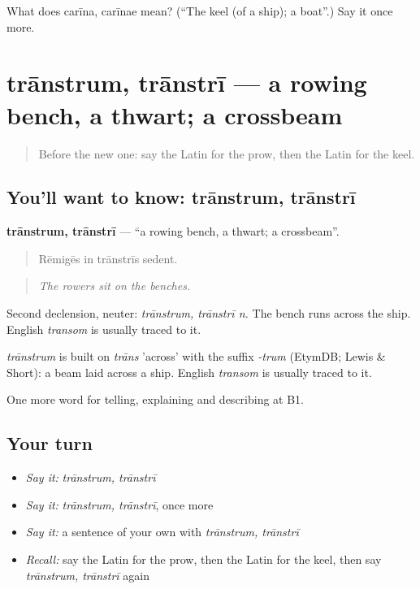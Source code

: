 \begin{tcolorbox}[breakable,colback=teal!4,colframe=teal!35!black,title={Before you move on}]
What does carīna, carīnae mean? (\textquotedblleft{}The keel (of a ship); a boat\textquotedblright{}.) Say it once more.
\end{tcolorbox}
\section[trānstrum, trānstrī]{trānstrum, trānstrī — a rowing bench, a thwart; a crossbeam}

\label{lesson:LA-C436-transtrum}



\begin{quote}
Before the new one: say the Latin for the prow, then the Latin for the keel.
\end{quote}

\subsection*{You'll want to know: trānstrum, trānstrī}
\textbf{trānstrum, trānstrī} — \textquotedblleft{}a rowing bench, a thwart; a crossbeam\textquotedblright{}.

\begin{quote}
Rēmigēs in trānstrīs sedent.
\end{quote}

\begin{quote}
\emph{The rowers sit on the benches.}
\end{quote}

Second declension, neuter: \emph{trānstrum, trānstrī n.} The bench runs across the ship. English \emph{transom} is usually traced to it.

\begin{cousinweb}
\emph{trānstrum} is built on \emph{trāns} 'across' with the suffix \emph{-trum} (EtymDB; Lewis \& Short): a beam laid across a ship. English \emph{transom} is usually traced to it.
\end{cousinweb}

\begin{grammarlens}[title={What you've built}]
One more word for telling, explaining and describing at B1.
\end{grammarlens}

\subsection*{Your turn}
\begin{itemize}
\raggedright
  \item \emph{Say it:} \emph{trānstrum, trānstrī}
  \item \emph{Say it:} \emph{trānstrum, trānstrī}, once more
  \item \emph{Say it:} a sentence of your own with \emph{trānstrum, trānstrī}
  \item \emph{Recall:} say the Latin for the prow, then the Latin for the keel, then say \emph{trānstrum, trānstrī} again
\end{itemize}

